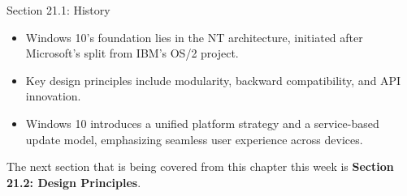 \begin{notes}{Section 21.1: History}
    \begin{highlight}
        \begin{itemize}
            \item Windows 10's foundation lies in the NT architecture, initiated after Microsoft's split from IBM's OS/2 project.
            \item Key design principles include modularity, backward compatibility, and API innovation.
            \item Windows 10 introduces a unified platform strategy and a service-based update model, emphasizing seamless user experience across devices.
        \end{itemize}
    \end{highlight}
\end{notes}

The next section that is being covered from this chapter this week is \textbf{Section 21.2: Design Principles}.

